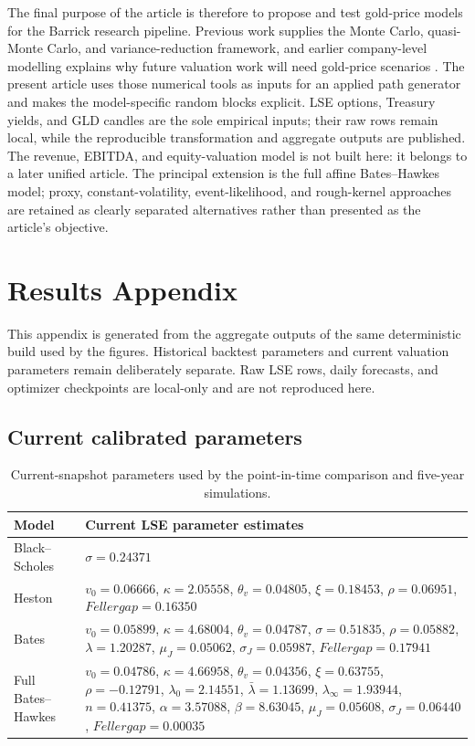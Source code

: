 \documentclass[a4paper,10pt,titlepage,oneside,openany]{book}
\theoremstyle{plain}
\theoremstyle{definition}
\theoremstyle{remark}
\begin{document}
The final purpose of the article is therefore to propose and test gold-price models for the Barrick research pipeline. Previous work supplies the Monte Carlo, quasi-Monte Carlo, and variance-reduction framework, and earlier company-level modelling explains why future valuation work will need gold-price scenarios \cite{BarrickArticle3,BarrickArticle4,BarrickArticle5}. The present article uses those numerical tools as inputs for an applied path generator and makes the model-specific random blocks explicit. LSE options, Treasury yields, and GLD candles are the sole empirical inputs; their raw rows remain local, while the reproducible transformation and aggregate outputs are published. The revenue, EBITDA, and equity-valuation model is not built here: it belongs to a later unified article. The principal extension is the full affine Bates--Hawkes model; proxy, constant-volatility, event-likelihood, and rough-kernel approaches are retained as clearly separated alternatives rather than presented as the article's objective.

\chapter*{Results Appendix}
{}

This appendix is generated from the aggregate outputs of the same deterministic build used by the figures. Historical backtest parameters and current valuation parameters remain deliberately separate. Raw LSE rows, daily forecasts, and optimizer checkpoints are local-only and are not reproduced here.

\section*{Current calibrated parameters}
\begin{table}[H]
\centering
\scriptsize
\setlength{\tabcolsep}{3pt}
\begin{tabularx}{\textwidth}{@{}p{2.8cm}X@{}}
\toprule
Model & Current LSE parameter estimates \\
\midrule
Black--Scholes & $\sigma=0.24371$ \\
Heston & $v_0=0.06666$, $\kappa=2.05558$, $\theta_v=0.04805$, $\xi=0.18453$, $\rho=0.06951$, $Feller gap=0.16350$ \\
Bates & $v_0=0.05899$, $\kappa=4.68004$, $\theta_v=0.04787$, $\sigma=0.51835$, $\rho=0.05882$, $\lambda=1.20287$, $\mu_J=0.05062$, $\sigma_J=0.05987$, $Feller gap=0.17941$ \\
Full Bates--Hawkes & $v_0=0.04786$, $\kappa=4.66958$, $\theta_v=0.04356$, $\xi=0.63755$, $\rho=-0.12791$, $\lambda_0=2.14551$, $\bar\lambda=1.13699$, $\lambda_\infty=1.93944$, $n=0.41375$, $\alpha=3.57088$, $\beta=8.63045$, $\mu_J=0.05608$, $\sigma_J=0.06440$, $Feller gap=0.00035$ \\
\bottomrule
\end{tabularx}
\caption{Current-snapshot parameters used by the point-in-time comparison and five-year simulations.}
\label{tab:appendix-current-parameters}
\end{table}
\end{document}
